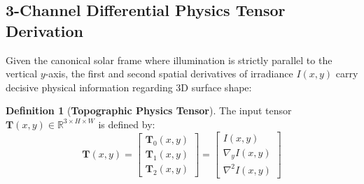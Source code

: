 \documentclass[10pt,journal,compsoc]{IEEEtran}
\theoremstyle{definition}
\newtheorem{definition}{Definition}
\begin{document}
\subsection{3-Channel Differential Physics Tensor Derivation}
Given the canonical solar frame where illumination is strictly parallel to the vertical $y$-axis, the first and second spatial derivatives of irradiance $I(x,y)$ carry decisive physical information regarding 3D surface shape:

\begin{definition}[\textbf{Topographic Physics Tensor}]
The input tensor $\mathbf{T}(x, y) \in \mathbb{R}^{3 \times H \times W}$ is defined by:
\begin{equation}
\mathbf{T}(x,y) = \begin{bmatrix} \mathbf{T}_0(x,y) \\ \mathbf{T}_1(x,y) \\ \mathbf{T}_2(x,y) \end{bmatrix} = \begin{bmatrix} I(x,y) \\ \nabla_y I(x,y) \\ \nabla^2 I(x,y) \end{bmatrix}
\end{equation}
\end{definition}
\end{document}
